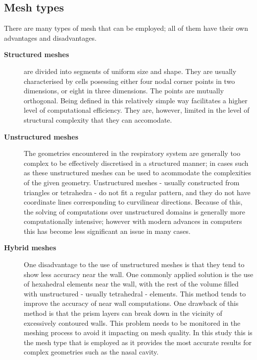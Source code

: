 \subsection{Mesh types} \label{mtypes}

There are many types of mesh that can be employed; all of them have their own advantages and disadvantages. 

\begin{description}
  \item[\textbf{Structured meshes}]
    are divided into segments of uniform size and shape. They are usually characterised by cells posessing either four nodal corner points in two dimensions, or eight in three dimensions. The points are mutually orthogonal. Being defined in this relatively simple way facilitates a higher level of computational efficiency. They are, however, limited in the level of structural complexity that they can accomodate.

  \item[\textbf{Unstructured meshes}] 
    The geometries encountered in the respiratory system are generally too complex to be effectively discretised in a structured manner; in cases such as these unstructured meshes can be used to acommodate the complexities of the given geometry. Unstructured meshes - usually constructed from triangles or tetrahedra - do not fit a regular pattern, and they do not have coordinate lines corresponding to curvilinear directions. Because of this, the solving of computations over unstructured domains is generally more computationally intensive; however with modern advances in computers this has become less significant an issue in many cases.

  \item[\textbf{Hybrid meshes}] 
    One disadvantage to the use of unstructured meshes is that they tend to show less accuracy near the wall. One commonly applied solution is the use of hexahedral elements near the wall, with the rest of the volume filled with unstructured - usually tetrahedral - elements. This method tends to improve the accuracy of near wall computations. One drawback of this method is that the prism layers can break down in the vicinity of excessively contoured walls. This problem needs to be monitored in the meshing process to avoid it impacting on mesh quality. In this study this is the mesh type that is employed as it provides the most accurate results for complex geometries such as the nasal cavity.

\end{description}


